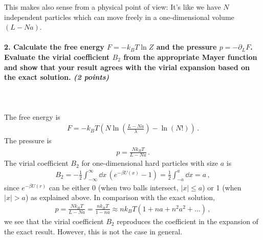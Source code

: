 This makes also sense from a physical point of view: It's like we have $N$ independent particles which can move freely in a one-dimensional volume 
$(L-Na)$.


\newpage

\paragraph{2. Calculate the free energy $F=-k_BT\ln Z$ and the pressure $p=-\partial_L F$. Evaluate the virial
coefficient $B_2$ from the appropriate Mayer function and show that your result agrees with the
virial expansion based on the exact solution. \textit{(2 points)}
} \ \\
\\
The free energy is
\begin{align}
	F = - k_B T \left( N \ln\left( \frac{L-Na}{\lambda} \right) - \ln\left(N!\right) \right) \,.
\end{align}
The pressure is
\begin{align}
	p = \frac{N k_B T}{L-Na} \,.
\end{align}
The virial coefficient $B_2$ for one-dimensional hard particles with size $a$ is
\begin{align}
	B_2 = -\frac{1}{2} \int_{-\infty}^{\infty} \dd x \, \left( e^{-\beta U(x)} - 1 \right) = \frac{1}{2} \int_{-a}^{a} \dd x = a \,,
\end{align}
since $e^{-\beta U(r)}$ can be either 0 (when two balls intersect, $\vert x\vert \leq a$) or 1 (when $\vert x\vert > a$) as explained above. 
In comparison with the exact solution,
\begin{align}
	p = \frac{N k_B T}{L-Na} = \frac{n k_B T}{1-na} \approx n k_B T \left( 1+na+n^2a^2+... \right) \,,
\end{align}
we see that the virial coefficient $B_2$ reproduces the coefficient in the expansion of the exact result. 
However, this is not the case in general.